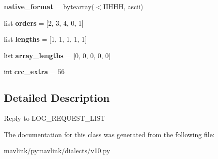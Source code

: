 \begin{DoxyCompactItemize}
{\bfseries native\+\_\+format} = bytearray(\textquotesingle{}$<$I\+I\+H\+HH\textquotesingle{}, \textquotesingle{}ascii\textquotesingle{})
\item 
\mbox{\label{classpymavlink_1_1dialects_1_1v10_1_1MAVLink__log__entry__message_a4e7c3f75903847a3f971550ea517f864}} 
list {\bfseries orders} = \mbox{[}2, 3, 4, 0, 1\mbox{]}
\item 
\mbox{\label{classpymavlink_1_1dialects_1_1v10_1_1MAVLink__log__entry__message_a36ae9d76c37d9650ca01df726191939d}} 
list {\bfseries lengths} = \mbox{[}1, 1, 1, 1, 1\mbox{]}
\item 
\mbox{\label{classpymavlink_1_1dialects_1_1v10_1_1MAVLink__log__entry__message_ac4a06876b12dbc9247ff2e496d6d8cc2}} 
list {\bfseries array\+\_\+lengths} = \mbox{[}0, 0, 0, 0, 0\mbox{]}
\item 
\mbox{\label{classpymavlink_1_1dialects_1_1v10_1_1MAVLink__log__entry__message_ad1ca7e1a4c0355ca9d6fe7cef64ea719}} 
int {\bfseries crc\+\_\+extra} = 56
\end{DoxyCompactItemize}


\subsection{Detailed Description}
\begin{DoxyVerb}Reply to LOG_REQUEST_LIST
\end{DoxyVerb}
 

The documentation for this class was generated from the following file\+:\begin{DoxyCompactItemize}
\item 
mavlink/pymavlink/dialects/v10.\+py\end{DoxyCompactItemize}
